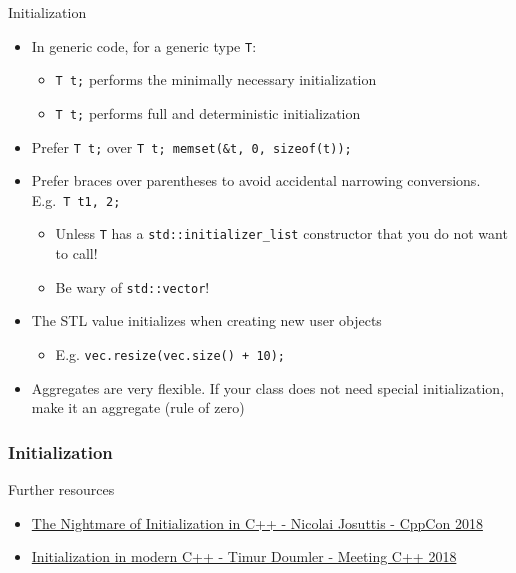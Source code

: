 \begin{frame}[fragile]
  \begin{goodpractice}{Initialization}
    \begin{itemize}
      \item In generic code, for a generic type \texttt{T}:
      \begin{itemize}
        \item \texttt{T t;} performs the minimally necessary initialization
        \item \texttt{T t{};} performs full and deterministic initialization
      \end{itemize}
      \item Prefer \texttt{T t{};} over \texttt{T t; memset(&t, 0, sizeof(t));}
      \item Prefer braces over parentheses to avoid accidental narrowing conversions. E.g.\ \texttt{T t{1, 2};}
      \begin{itemize}
        \item Unless \texttt{T} has a \texttt{std::initializer_list} constructor that you do not want to call!
        \item Be wary of \texttt{std::vector}!
      \end{itemize}
      \item The STL value initializes when creating new user objects
      \begin{itemize}
        \item E.g. \texttt{vec.resize(vec.size() + 10);}
      \end{itemize}
      \item Aggregates are very flexible. If your class does not need special initialization, make it an aggregate (rule of zero)
    \end{itemize}
  \end{goodpractice}
\end{frame}

\begin{frame}[fragile]
  \frametitle{Initialization}
  \begin{block}{Further resources}
    \begin{itemize}
      \item \href{https://www.youtube.com/watch?v=7DTlWPgX6zs}{The Nightmare of Initialization in C++ - Nicolai Josuttis - CppCon 2018}
      \item \href{https://www.youtube.com/watch?v=ZfP4VAK21zc}{Initialization in modern C++ - Timur Doumler - Meeting C++ 2018}
    \end{itemize}
  \end{block}
\end{frame}
